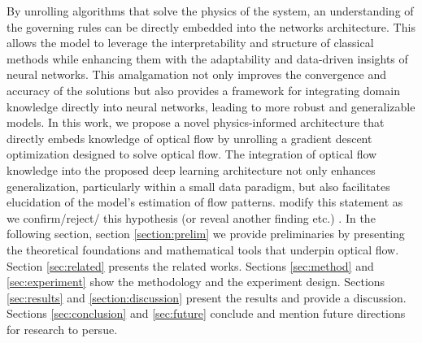 \IEEEPARstart{}{} By unrolling algorithms that solve the physics of the system, an understanding of the governing rules can be directly embedded into the networks architecture. This allows the model to leverage the interpretability and structure of classical methods while enhancing them with the adaptability and data-driven insights of neural networks. This amalgamation not only improves the convergence and accuracy of the solutions but also provides a framework for integrating domain knowledge directly into neural networks, leading to more robust and generalizable models.
\IEEEPARstart{}{} In this work, we propose a novel physics-informed architecture that directly embeds knowledge of optical flow by unrolling a gradient descent optimization designed to solve optical flow. The integration of optical flow knowledge into the proposed deep learning architecture not only enhances generalization, particularly within a small data paradigm, but also facilitates elucidation of the model's estimation of flow patterns. \color{orange} modify this statement as we confirm/reject/ this hypothesis (or reveal another finding etc.) \color{black}.
\IEEEPARstart{}{} In the following section, section \ref{section:prelim} we provide preliminaries by presenting the theoretical foundations and mathematical tools that underpin optical flow. Section \ref{sec:related} presents the related works. Sections \ref{sec:method} and \ref{sec:experiment} show the methodology and the experiment design. Sections \ref{sec:results} and \ref{section:discussion} present the results and provide a discussion. Sections \ref{sec:conclusion} and \ref{sec:future} conclude and mention future directions for research to persue.